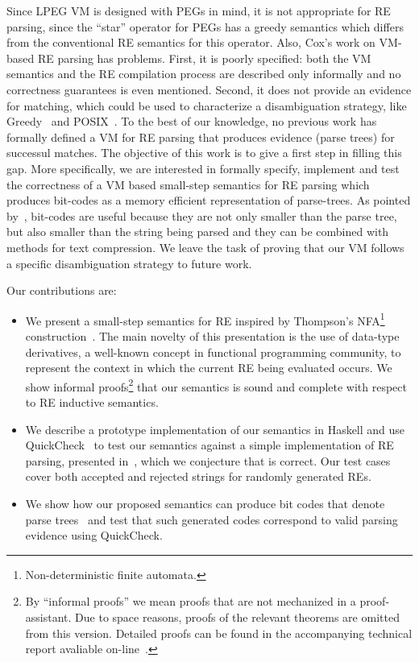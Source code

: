 \documentclass[sigplan]{acmart}
\theoremstyle{definition}
\begin{document}
Since LPEG VM is designed with PEGs in mind, it is not appropriate for RE parsing, since the ``star''
operator for PEGs has a greedy semantics which differs from the conventional RE semantics for this operator. Also, Cox's work
on VM-based RE parsing has problems. First, it is poorly specified: both the VM semantics and the RE
compilation process are described only informally and no correctness guarantees is even mentioned. Second,
it does not provide an evidence for matching, which could be used to characterize a disambiguation strategy, like
Greedy~\cite{Frisch2004} and POSIX~\cite{Sulzmann14}. To the best of our knowledge, no previous work
has formally defined a VM for RE parsing that produces evidence (parse trees) for successul matches.
The objective of this work is to give a first step in filling this gap. More specifically, we are interested in formally
specify, implement and test the correctness of a VM based small-step semantics for RE parsing which produces bit-codes as
a memory efficient representation of parse-trees. As pointed by~\cite{Lasse2011}, bit-codes are useful because they
are not only smaller than the parse tree, but also smaller than the string being parsed and they can be combined with methods
for text compression. We leave the task of proving that our VM follows a specific disambiguation
strategy to future work.

Our contributions are:

\begin{itemize}
  \item We present a small-step semantics for RE inspired by  Thompson's NFA\footnote{Non-deterministic finite automata.}
        construction~\cite{Thompson1968}. The main novelty of this presentation is
        the use of data-type derivatives, a well-known concept in functional programming community, to represent
        the context in which the current RE being evaluated occurs. We show informal proofs\footnote{By ``informal proofs'' we
        mean proofs that are not mechanized in a proof-assistant. Due to space reasons, proofs of the relevant theorems are omitted from this
        version. Detailed proofs can be found in the accompanying technical report avaliable on-line~\cite{regexvm-rep}.} that our semantics
        is sound and complete with respect to RE inductive semantics.
  \item We describe a prototype implementation of our semantics in Haskell and use QuickCheck~\cite{Claessen2000} to test our semantics
        against a simple implementation of RE parsing, presented in~\cite{Fischer2010}, which we conjecture that is correct.
        Our test cases cover both accepted and rejected strings for randomly generated REs.
  \item We show how our proposed semantics can produce bit codes that denote parse trees~\cite{Lasse2011} and test that
        such generated codes correspond to valid parsing evidence using QuickCheck.
\end{itemize}
\end{document}
